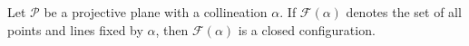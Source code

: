 Let $\mathcal{P}$ be a projective plane with a collineation $\alpha$. If $\mathcal{F}(\alpha)$ denotes the set of all points and lines fixed by $\alpha$, then $\mathcal{F}(\alpha)$ is a closed configuration.
